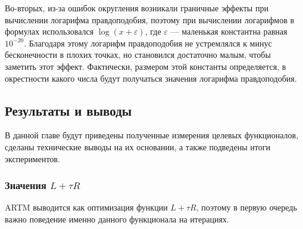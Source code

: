 \documentclass[12pt]{article}
\begin{document}
Во-вторых, из-за ошибок округления возникали граничные эффекты при вычислении логарифма правдоподобия, поэтому при вычислении логарифмов в формулах использовался $\log(x + \varepsilon)$, где $\varepsilon$ ---  маленькая константна равная $10^{-20}$. Благодаря этому логарифм правдоподобия не устремлялся к минус бесконечности в плохих точках, но становился достаточно малым, чтобы заметить этот эффект. Фактически, размером этой константы определяется, в окрестности какого числа будут получаться  значения логарифма правдоподобия.
\subsection{Результаты и выводы}
В данной главе будут приведены полученные измерения целевых функционалов, сделаны технические  выводы на их основании, а также подведены итоги экспериментов.
\subsubsection{Значения $L + \tau R$}
ARTM выводится как оптимизация функции $L + \tau R$, поэтому в первую очередь важно поведение именно данного функционала на итерациях.
\end{document}
